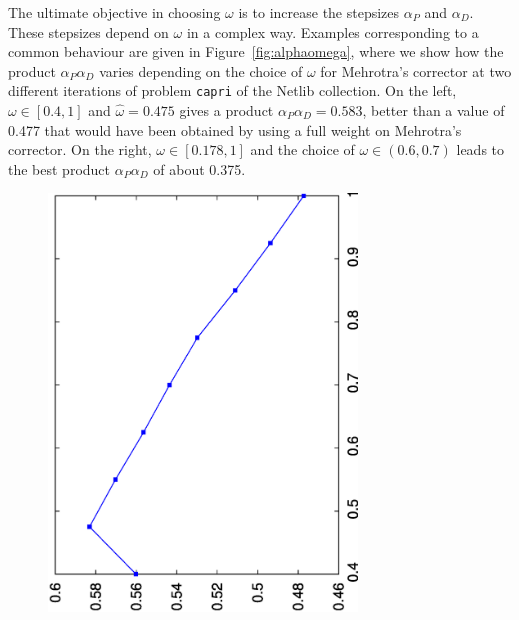 The ultimate objective in choosing $\omega$ is to increase the stepsizes 
$\alpha_P$ and $\alpha_D$. These stepsizes depend on $\omega$ 
in a complex way. Examples corresponding to a common behaviour 
are given in Figure~\ref{fig:alphaomega}, where we show how the
product $\alpha_P\alpha_D$
varies depending on the choice of $\omega$ for Mehrotra's corrector at 
two different iterations of problem {\tt capri} of the Netlib collection.
On the left, $\omega \in [0.4, 1]$ and $\hat\omega=0.475$ gives a product
$\alpha_P\alpha_D=0.583$, better than a value of 0.477 that would have
been obtained by using a full weight on Mehrotra's corrector.
On the right, $\omega \in [0.178, 1]$ and the choice of 
$\omega \in (0.6, 0.7)$ leads to the best 
product $\alpha_P\alpha_D$ of about 0.375.
%
\begin{figure}[ht]
  \vspace{-3ex}
  \hspace{-3em}
  \begin{minipage}[t]{0.54\textwidth}
  \includegraphics[width=0.73\textwidth,angle=-90]{figures/alphaomega-1.eps}
  \end{minipage} 
  \hspace{-2em}
  \begin{minipage}[t]{0.54\textwidth}

\end{minipage}
\end{figure}

